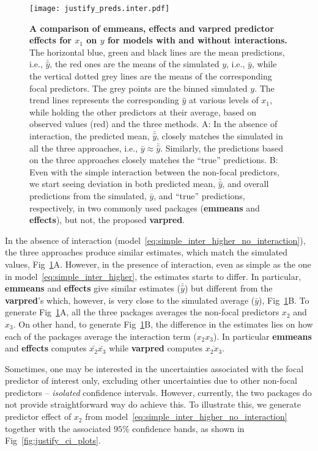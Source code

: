 \documentclass[10pt,letterpaper]{article}
\newcommand{\pkg}[1]{\textbf{#1}}
\let\over=\overline
\begin{document}
\begin{figure}[!h]
\centering
\texttt{[image: justify\_preds.inter.pdf]}
\caption{{\bf A comparison of \pkg{emmeans}, \pkg{effects} and \pkg{varpred} predictor effects for $x_1$ on $y$ for models with and without interactions.}
The horizontal blue, green and black lines are the mean predictions, i.e., $\bar{\hat{y}}$, the red ones are the means of the simulated $y$, i.e., $\bar{y}$, while the vertical dotted grey lines are the means of the corresponding focal predictors. The grey points are the binned simulated $y$. The trend lines represents the corresponding $\hat{y}$ at various levels of $x_1$, while holding the other predictors at their average, based on observed values (red) and the three methods. A: In the absence of interaction, the predicted mean, $\bar{\hat{y}}$, closely matches the simulated in all the three approaches, i.e., $\bar{y} \approx \bar{\hat{y}}$. Similarly, the predictions based on the three approaches closely matches the ``true'' predictions. B: Even with the simple interaction between the non-focal predictors, we start seeing deviation in both predicted mean, $\bar{\hat{y}}$, and overall predictions from the simulated, $\bar{y}$, and ``true'' predictions, respectively, in two commonly used packages (\pkg{emmeans} and \pkg{effects}), but not, the proposed \pkg{varpred}.}
\label{fig:justify_plots}
\end{figure}

In the absence of interaction (model~\ref{eq:simple_inter_higher_no_interaction}), the three approaches produce similar estimates, which match the simulated values, Fig~\ref{fig:justify_plots}A. However, in the presence of interaction, even as simple as the one in model~\ref{eq:simple_inter_higher}, the estimates starts to differ. In particular, \pkg{emmeans} and \pkg{effects} give similar estimates ($\bar{\hat{y}}$) but different from the \pkg{varpred}'s which, however, is very close to the simulated average ($\bar{y}$), Fig~\ref{fig:justify_plots}B. To generate Fig~\ref{fig:justify_plots}A, all the three packages averages the non-focal predictors $x_2$ and $x_3$. On other hand, to generate Fig~\ref{fig:justify_plots}B, the difference in the estimates lies on how each of the packages average the interaction term ($x_2x_3$). In particular \pkg{emmeans} and \pkg{effects} computes $\bar{x_2}\bar{x_3}$ while \pkg{varpred} computes $\over{x_2x_3}$.

Sometimes, one may be interested in the uncertainties associated with the focal predictor of interest only, excluding other uncertainties due to other non-focal predictors -- \emph{isolated} confidence intervals. However, currently, the two packages do not provide straightforward way do achieve this. To illustrate this, we generate predictor effect of $x_2$ from model~\ref{eq:simple_inter_higher_no_interaction} together with the associated $95\%$ confidence bands, as shown in Fig~\ref{fig:justify_ci_plots}. 
\end{document}
